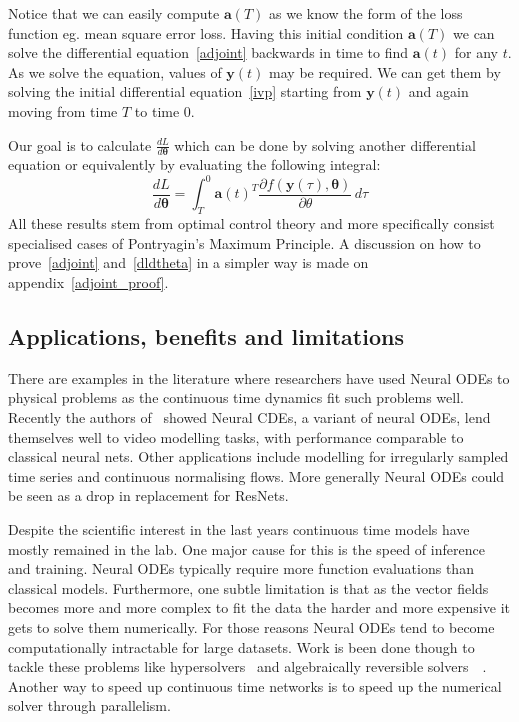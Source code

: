 \documentclass[11pt]{article}
\begin{document}
    Notice that we can easily compute $\pmb{a}(T)$ as we know the form of the loss function eg.
    mean square error loss.
    Having this initial condition $\pmb{a}(T)$ we can solve the differential equation~\eqref{adjoint} backwards in time to find $\pmb{a}(t)$ for any $t$.
    As we solve the equation, values of $\pmb{y}(t)$ may be required.
    We can get them by solving the initial differential equation~\eqref{ivp} starting from $\pmb{y}(t)$ and again moving from time $T$ to time $0$.

    Our goal is to calculate $\frac{dL}{d\pmb{\theta}}$ which can be done by solving another differential equation or equivalently by evaluating the following integral:
    \begin{equation}
        \frac{dL}{d\pmb{\theta}}
        = \int_T^0
        \pmb{a}(t)^T
        \frac
        {\partial f(\pmb{y}(\tau), \pmb{\theta})}
        {\partial \theta}
        \, d\tau
        \label{dldtheta}
    \end{equation}
    All these results stem from optimal control theory and more specifically consist specialised cases of Pontryagin's Maximum Principle.
    A discussion on how to prove~\eqref{adjoint} and~\eqref{dldtheta} in a simpler way is made on appendix~\ref{adjoint_proof}.

    \subsection{Applications, benefits and limitations}
    There are examples in the literature where researchers have used Neural ODEs to physical problems as the continuous time dynamics fit such problems well.
    Recently the authors of~\cite{chiu2023exploiting} showed Neural CDEs, a variant of neural ODEs, lend themselves well to video modelling tasks, with performance comparable to classical neural nets.
    Other applications include modelling for irregularly sampled time series and continuous normalising flows.
    More generally Neural ODEs could be seen as a drop in replacement for ResNets.

    Despite the scientific interest in the last years continuous time models have mostly remained in the lab.
    One major cause for this is the speed of inference and training.
    Neural ODEs typically require more function evaluations than classical models.
    Furthermore, one subtle limitation is that as the vector fields becomes more and more complex to fit the data the harder and more expensive it gets to solve them numerically.
    For those reasons Neural ODEs tend to become computationally intractable for large datasets.
    Work is been done though to tackle these problems like hypersolvers~\cite{poli2020hypersolvers} and algebraically reversible solvers~\cite{kidger2021efficient}~\cite{zhuang2021mali}.
    Another way to speed up continuous time networks is to speed up the numerical solver through parallelism.
\end{document}
